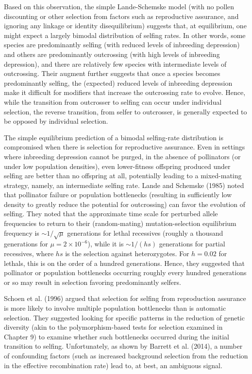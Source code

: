\documentclass{article}
\begin{document}
Based on this observation, the simple Lande-Schemske model (with no pollen discounting or other selection from factors such as reproductive assurance, and ignoring any linkage or identity disequilibrium) suggests that, at equilibrium, one might expect a largely bimodal distribution of selfing rates. In other words, some species are predominantly selfing (with reduced levels of inbreeding depression) and others are predominantly outcrossing (with high levels of inbreeding depression), and there are relatively few species with intermediate levels of outcrossing. Their augment further suggests that once a species becomes predominantly selfing, the (expected) reduced levels of inbreeding depression make it difficult for modifiers that increase the outcrossing rate to evolve. Hence, while the transition from outcrosser to selfing can occur under individual selection, the reverse transition, from selfer to outcrosser, is generally expected to be opposed by individual selection.

The simple equilibrium prediction of a bimodal selfing-rate distribution is compromised when there is selection for reproductive assurance. Even in settings where inbreeding depression cannot be purged, in the absence of pollinators (or under low population densities), even lower-fitness offspring produced under selfing are better than no offspring at all, potentially leading to a mixed-mating strategy, namely, an intermediate selfing rate. Lande and Schemske (1985) noted that pollinator failure or population bottlenecks (resulting in sufficiently low density to greatly reduce the potential for outcrossing) can favor the evolution of selfing. They noted that the approximate time scale for perturbed allele frequencies to return to their (random-mating) mutation-selection equilibrium frequency is  $ \sim 1/\sqrt{\mu} $ generations for lethal recessives (roughly a thousand generations for  $ \mu = 2 \times 10^{-6} $), while it is  $ \sim 1/(hs) $ generations for partial recessives, where  $ hs $ is the selection against heterozygotes. For  $ h = 0.02 $ for lethals, this is on the order of a hundred generations. Hence, they suggested that pollinator or population bottlenecks occurring roughly every hundred generations or so may result in selection favoring predominantly selfers.

Schoen et al. (1996) argued that selection for selfing from reproduction assurance is more likely to involve multiple population bottlenecks than is automatic selection. They suggested looking for specific patterns in the reduction of genetic diversity (akin to the polymorphism-based tests for selection examined in Chapter 9) to examine whether such bottlenecks occurred during the initial transition to selfing. Unfortunately, as shown by Barrett et al. (2014), a number of confounding factors (such as increased background selection from the reduction in the effective recombination rate) lead to, at best, an ambiguous signal.
\end{document}
